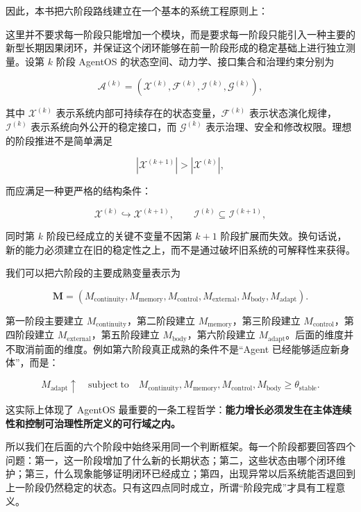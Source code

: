 因此，本书把六阶段路线建立在一个基本的系统工程原则上：

\begin{statementbox}
\centering
{}
\end{statementbox}

这里并不要求每一阶段只能增加一个模块，而是要求每一阶段只能引入一种主要的新型长期因果闭环，并保证这个闭环能够在前一阶段形成的稳定基础上进行独立测量。设第 \(k\) 阶段 AgentOS 的状态空间、动力学、接口集合和治理约束分别为

\[
\mathcal A^{(k)}
=
\left(
\mathcal X^{(k)},
\mathcal F^{(k)},
\mathcal I^{(k)},
\mathcal G^{(k)}
\right),
\]

其中 \(\mathcal X^{(k)}\) 表示系统内部可持续存在的状态变量，\(\mathcal F^{(k)}\) 表示状态演化规律，\(\mathcal I^{(k)}\) 表示系统向外公开的稳定接口，而 \(\mathcal G^{(k)}\) 表示治理、安全和修改权限。理想的阶段推进不是简单满足

\[
|\mathcal X^{(k+1)}|>|\mathcal X^{(k)}|,
\]

而应满足一种更严格的结构条件：

\[
\mathcal X^{(k)}
\hookrightarrow
\mathcal X^{(k+1)},
\qquad
\mathcal I^{(k)}
\subseteq
\mathcal I^{(k+1)},
\]

同时第 \(k\) 阶段已经成立的关键不变量不因第 \(k+1\) 阶段扩展而失效。换句话说，新的能力必须建立在旧的稳定性之上，而不是通过破坏旧系统的可解释性来获得。

我们可以把六阶段的主要成熟变量表示为

\[
\mathbf M
=
\left(
M_{\mathrm{continuity}},
M_{\mathrm{memory}},
M_{\mathrm{control}},
M_{\mathrm{external}},
M_{\mathrm{body}},
M_{\mathrm{adapt}}
\right).
\]

第一阶段主要建立 \(M_{\mathrm{continuity}}\)，第二阶段建立 \(M_{\mathrm{memory}}\)，第三阶段建立 \(M_{\mathrm{control}}\)，第四阶段建立 \(M_{\mathrm{external}}\)，第五阶段建立 \(M_{\mathrm{body}}\)，第六阶段建立 \(M_{\mathrm{adapt}}\)。后面的维度并不取消前面的维度。例如第六阶段真正成熟的条件不是“Agent 已经能够适应新身体”，而是：

\[
M_{\mathrm{adapt}}\uparrow
\quad
\mathrm{subject\ to}
\quad
M_{\mathrm{continuity}},
M_{\mathrm{memory}},
M_{\mathrm{control}},
M_{\mathrm{body}}
\geq
\theta_{\mathrm{stable}}.
\]

这实际上体现了 AgentOS 最重要的一条工程哲学：\textbf{能力增长必须发生在主体连续性和控制可治理性所定义的可行域之内。}

所以我们在后面的六个阶段中始终采用同一个判断框架。每一个阶段都要回答四个问题：第一，这一阶段增加了什么新的长期状态；第二，这些状态由哪个闭环维护；第三，什么现象能够证明闭环已经成立；第四，出现异常以后系统能否退回到上一阶段仍然稳定的状态。只有这四点同时成立，所谓“阶段完成”才具有工程意义。


